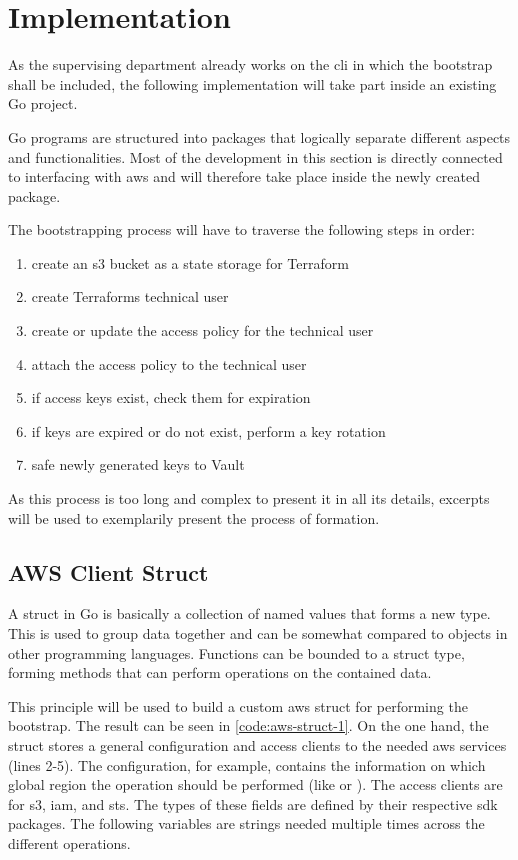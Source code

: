 \chapter{Implementation}
As the supervising department already works on the \ac{cli} in which the bootstrap shall be included, the following implementation will take part inside an existing Go project.

Go programs are structured into packages that logically separate different aspects and functionalities.
Most of the development in this section is directly connected to interfacing with \ac{aws} and will therefore take place inside the newly created  package.

The bootstrapping process will have to traverse the following steps in order:
\begin{enumerate}
    \item create an \ac{s3} bucket as a state storage for Terraform
    \item create Terraforms technical user
    \item create or update the access policy for the technical user
    \item attach the access policy to the technical user
    \item if access keys exist, check them for expiration
    \item if keys are expired or do not exist, perform a key rotation
    \item safe newly generated keys to Vault
\end{enumerate}
As this process is too long and complex to present it in all its details, excerpts will be used to exemplarily present the process of formation.

\section{AWS Client Struct}
A struct in Go is basically a collection of named values that forms a new type.
This is used to group data together and can be somewhat compared to objects in other programming languages.
Functions can be bounded to a struct type, forming methods that can perform operations on the contained data.

This principle will be used to build a custom \ac{aws} struct for performing the bootstrap.
The result can be seen in \autoref{code:aws-struct-1}.
On the one hand, the struct stores a general configuration and access clients to the needed \ac{aws} services (lines 2-5).
The configuration, for example, contains the information on which global region the operation should be performed (like  or ).
The access clients are for \ac{s3}, \ac{iam}, and \ac{sts}.
The types of these fields are defined by their respective \ac{sdk} packages.
The following variables are strings needed multiple times across the different operations.

